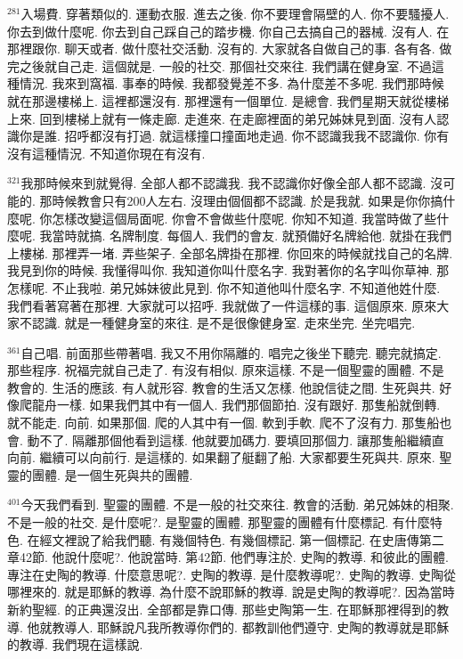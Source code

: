 \documentclass{book}
\begin{document}
$^{281}$入場費.
穿著類似的.
運動衣服.
進去之後.
你不要理會隔壁的人.
你不要騷擾人.
你去到做什麼呢.
你去到自己踩自己的踏步機.
你自己去搞自己的器械.
沒有人.
在那裡跟你.
聊天或者.
做什麼社交活動.
沒有的.
大家就各自做自己的事.
各有各.
做完之後就自己走.
這個就是.
一般的社交.
那個社交來往.
我們講在健身室.
不過這種情況.
我來到窩福.
事奉的時候.
我都發覺差不多.
為什麼差不多呢.
我們那時候就在那邊樓梯上.
這裡都還沒有.
那裡還有一個單位.
是總會.
我們星期天就從樓梯上來.
回到樓梯上就有一條走廊.
走進來.
在走廊裡面的弟兄姊妹見到面.
沒有人認識你是誰.
招呼都沒有打過.
就這樣撞口撞面地走過.
你不認識我我不認識你.
你有沒有這種情況.
不知道你現在有沒有.

$^{321}$我那時候來到就覺得.
全部人都不認識我.
我不認識你好像全部人都不認識.
沒可能的.
那時候教會只有200人左右.
沒理由個個都不認識.
於是我就.
如果是你你搞什麼呢.
你怎樣改變這個局面呢.
你會不會做些什麼呢.
你知不知道.
我當時做了些什麼呢.
我當時就搞.
名牌制度.
每個人.
我們的會友.
就預備好名牌給他.
就掛在我們上樓梯.
那裡弄一堵.
弄些架子.
全部名牌掛在那裡.
你回來的時候就找自己的名牌.
我見到你的時候.
我懂得叫你.
我知道你叫什麼名字.
我對著你的名字叫你草神.
那怎樣呢.
不止我啦.
弟兄姊妹彼此見到.
你不知道他叫什麼名字.
不知道他姓什麼.
我們看著寫著在那裡.
大家就可以招呼.
我就做了一件這樣的事.
這個原來.
原來大家不認識.
就是一種健身室的來往.
是不是很像健身室.
走來坐完.
坐完唱完.

$^{361}$自己唱.
前面那些帶著唱.
我又不用你隔離的.
唱完之後坐下聽完.
聽完就搞定.
那些程序.
祝福完就自己走了.
有沒有相似.
原來這樣.
不是一個聖靈的團體.
不是教會的.
生活的應該.
有人就形容.
教會的生活又怎樣.
他說信徒之間.
生死與共.
好像爬龍舟一樣.
如果我們其中有一個人.
我們那個節拍.
沒有跟好.
那隻船就倒轉.
就不能走.
向前.
如果那個.
爬的人其中有一個.
軟到手軟.
爬不了沒有力.
那隻船也會.
動不了.
隔離那個他看到這樣.
他就要加碼力.
要填回那個力.
讓那隻船繼續直向前.
繼續可以向前行.
是這樣的.
如果翻了艇翻了船.
大家都要生死與共.
原來.
聖靈的團體.
是一個生死與共的團體.

$^{401}$今天我們看到.
聖靈的團體.
不是一般的社交來往.
教會的活動.
弟兄姊妹的相聚.
不是一般的社交.
是什麼呢?.
是聖靈的團體.
那聖靈的團體有什麼標記.
有什麼特色.
在經文裡說了給我們聽.
有幾個特色.
有幾個標記.
第一個標記.
在史唐傳第二章42節.
他說什麼呢?.
他說當時.
第42節.
他們專注於.
史陶的教導.
和彼此的團體.
專注在史陶的教導.
什麼意思呢?.
史陶的教導.
是什麼教導呢?.
史陶的教導.
史陶從哪裡來的.
就是耶穌的教導.
為什麼不說耶穌的教導.
說是史陶的教導呢?.
因為當時新約聖經.
的正典還沒出.
全部都是靠口傳.
那些史陶第一生.
在耶穌那裡得到的教導.
他就教導人.
耶穌說凡我所教導你們的.
都教訓他們遵守.
史陶的教導就是耶穌的教導.
我們現在這樣說.
\end{document}
